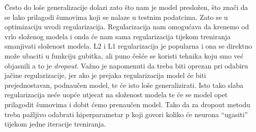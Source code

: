 Često do loše generalizacije dolazi zato što nam je model presložen, što znači da se lako prilagodi šumovima koji se nalaze u testnim podatcima.
Zato se u optimizaciju uvodi regularizacija.
Regularizacija nam omogućava da krenemo od vrlo složenog modela i onda će nam sama regularizacija tijekom treniranja smanjivati složenost modela.
L2 i L1 regularizacija je popularna i ona se direktno može ubaciti u funkciju gubitka, ali puno češće se koristi tehnika koju smo već objasnili a to je \emph{dropout}.
Važno je napomenuti da treba biti oprezan pri odabiru jačine regularizacije, jer ako je prejaka regularizacija model će biti prejednostavan, podnaučen model, te će isto loše generalizirati.
Isto tako slaba regularizacija neće uopće utjecat na složenost modela te će se model opet prilagodit šumovima i dobit ćemo prenaučen model.
Tako da za dropout metodu treba pažljivo odabrati hiperparametar p koji govori koliko će neurona \enquote{ugasiti} tijekom jedne iteracije treniranja.
